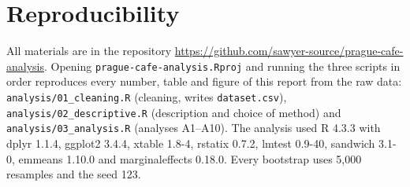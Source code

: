 \documentclass[11pt,a4paper]{article}
\begin{document}
\FloatBarrier
\section{Reproducibility}\label{app:repro}
{\sloppy All materials are in the repository \url{https://github.com/sawyer-source/prague-cafe-analysis}. Opening \texttt{prague-cafe-analysis.Rproj} and running the three scripts in order reproduces every number, table and figure of this report from the raw data: \texttt{analysis/01\_cleaning.R} (cleaning, writes \texttt{dataset.csv}), \texttt{analysis/02\_descriptive.R} (description and choice of method) and \texttt{analysis/03\_analysis.R} (analyses A1--A10). The analysis used R 4.3.3 with dplyr 1.1.4, ggplot2 3.4.4, xtable 1.8-4, rstatix 0.7.2, lmtest 0.9-40, sandwich 3.1-0, emmeans 1.10.0 and marginaleffects 0.18.0. Every bootstrap uses 5{,}000 resamples and the seed 123.\par}
\end{document}
